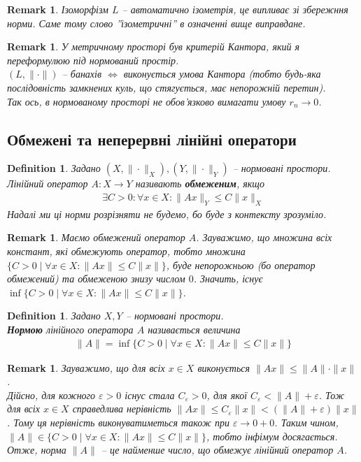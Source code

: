 \documentclass[a4paper, 10pt]{article}
\theoremstyle{theoremdd}
\theoremstyle{theoremdd}
\newtheorem{definition}[theorem]{Definition}
\theoremstyle{theoremdd}
\theoremstyle{theoremdd}
\theoremstyle{theoremdd}
\theoremstyle{theoremdd}
\newtheorem{remark}[theorem]{Remark}
\theoremstyle{theoremdd}
\theoremstyle{theoremdd}
\begin{document}
\begin{remark}
Ізоморфізм $L$ -- автоматично ізометрія, це випливає зі збережння норми. Саме тому слово ''ізометричні'' в означенні вище виправдане.
\end{remark}

\begin{remark}
У метричному просторі був критерій Кантора, який я переформулюю під нормований простір.\\
$(L,\|\cdot \|)$ -- банахів $\iff$ виконується умова Кантора (тобто будь-яка послідовність замкнених куль, що стягується, має непорожній перетин).\\
Так ось, в нормованому просторі не обов'язково вимагати умову $r_n \to 0$.
\end{remark}

\subsection{Обмежені та неперервні лінійні оператори}
\begin{definition}
Задано $(X, \|\cdot \|_X),(Y, \| \cdot \|_Y)$ -- нормовані простори.\\
Лінійний оператор $A \colon X \to Y$ називають \textbf{обмеженим}, якщо
\begin{align*}
\exists C > 0: \forall x \in X: \| Ax \|_Y \leq C \| x \|_X
\end{align*}
Надалі ми ці норми розрізняти не будемо, бо буде з контексту зрозуміло.
\end{definition}

\begin{remark}
Маємо обмежений оператор $A$. Зауважимо, що множина всіх констант, які обмежують оператор, тобто множина $\{C > 0 \mid \forall x \in X: \| Ax\| \leq C \|x\|\}$, буде непорожньою (бо оператор обмежений) та обмеженою знизу числом $0$. Значить, існує $\displaystyle\inf\{C > 0 \mid \forall x \in X: \| Ax\| \leq C \|x\|\}$.
\end{remark}

\begin{definition}
Задано $X,Y$ -- нормовані простори.\\
\textbf{Нормою} лінійного оператора $A$ називається величина
\begin{align*}
 \| A\| = \inf \{C > 0 \mid \forall x \in X: \| Ax \| \leq C \|x\|\}
\end{align*}
\end{definition}

\begin{remark}
Зауважимо, що для всіх $x \in X$ виконується $\|Ax\| \leq \|A\| \cdot \|x\|$.\\
Дійсно, для кожного $\varepsilon > 0$ існус стала $C_\varepsilon > 0$, для якої $C_\varepsilon < \|A\| + \varepsilon$. Тож для всіх $x \in X$ справедлива нерівність $\|A x\| \leq C_\varepsilon \|x\| < (\| A \| + \varepsilon) \|x\|$. Тому ця нерівність виконуватиметься також при $\varepsilon \to 0+0$. Таким чином, $\|A\| \in \{C > 0 \mid \forall x \in X: \|Ax\| \leq C \|x\|\}$, тобто інфімум досягається. \\
Отже, норма $\|A\|$ -- це найменше число, що обмежує лінійний оператор $A$.
\end{remark}
\end{document}
